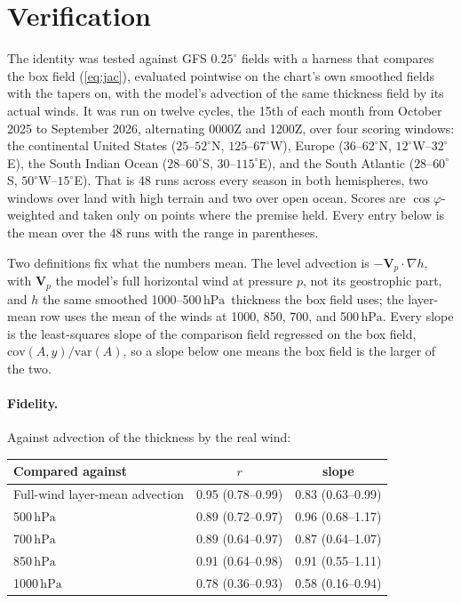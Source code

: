 \documentclass[11pt]{article}
\newcommand{\hPa}{\ensuremath{\,\mathrm{hPa}}}
\begin{document}
\section{Verification}
\label{sec:verify}

The identity was tested against GFS $0.25^\circ$ fields with a harness that compares the box field (\ref{eq:jac}), evaluated pointwise on the chart's own smoothed fields with the tapers on, with the model's advection of the same thickness field by its actual winds. It was run on twelve cycles, the 15th of each month from October 2025 to September 2026, alternating 0000Z and 1200Z, over four scoring windows: the continental United States ($25$--$52^\circ$N, $125$--$67^\circ$W), Europe ($36$--$62^\circ$N, $12^\circ$W--$32^\circ$E), the South Indian Ocean ($28$--$60^\circ$S, $30$--$115^\circ$E), and the South Atlantic ($28$--$60^\circ$S, $50^\circ$W--$15^\circ$E). That is 48 runs across every season in both hemispheres, two windows over land with high terrain and two over open ocean. Scores are $\cos\varphi$-weighted and taken only on points where the premise held. Every entry below is the mean over the 48 runs with the range in parentheses.

Two definitions fix what the numbers mean. The level advection is $-\mathbf{V}_p\cdot\nabla h$, with $\mathbf{V}_p$ the model's full horizontal wind at pressure $p$, not its geostrophic part, and $h$ the same smoothed 1000--500\hPa\ thickness the box field uses; the layer-mean row uses the mean of the winds at 1000, 850, 700, and 500\hPa. Every slope is the least-squares slope of the comparison field regressed on the box field, $\mathrm{cov}(A, y)/\mathrm{var}(A)$, so a slope below one means the box field is the larger of the two.

\paragraph{Fidelity.} Against advection of the thickness by the real wind:

\begin{center}
\begin{tabular}{@{}lcc@{}}
\toprule
Compared against & $r$ & slope \\
\midrule
Full-wind layer-mean advection & 0.95 (0.78--0.99) & 0.83 (0.63--0.99) \\
500\hPa & 0.89 (0.72--0.97) & 0.96 (0.68--1.17) \\
700\hPa & 0.89 (0.64--0.97) & 0.87 (0.64--1.07) \\
850\hPa & 0.91 (0.64--0.98) & 0.91 (0.55--1.11) \\
1000\hPa & 0.78 (0.36--0.93) & 0.58 (0.16--0.94) \\
\bottomrule
\end{tabular}
\end{center}
\end{document}
